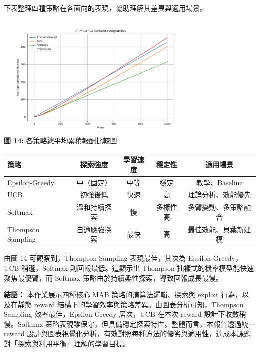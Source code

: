 \documentclass{article}
\begin{document}
下表整理四種策略在各面向的表現，協助理解其差異與適用場景。
\begin{center}
\includegraphics[width=0.75\textwidth]{./plots/mab_comparison.png} \\
\textbf{圖 14:} 各策略總平均累積報酬比較圖
\end{center}
\begin{center}
\begin{tabular}{|l|c|c|c|c|}
\hline
\textbf{策略} & \textbf{探索強度} & \textbf{學習速度} & \textbf{穩定性} & \textbf{適用場景} \\\hline
Epsilon-Greedy & 中（固定） & 中等 & 穩定 & 教學、Baseline \\\hline
UCB & 初強後低 & 快速 & 高 & 理論分析、效能優先 \\\hline
Softmax & 溫和持續探索 & 慢 & 多樣性高 & 多臂變動、多策略融合 \\\hline
Thompson Sampling & 自適應強探索 & 最快 & 高 & 最佳效能、貝葉斯建模 \\\hline
\end{tabular}
\end{center}

由圖 14 可觀察到，Thompson Sampling 表現最佳，其次為 Epsilon-Greedy，UCB 稍遜，Softmax 則回報最低。這顯示出 Thompson 抽樣式的機率模型能快速聚焦最優臂，而 Softmax 策略由於持續柔性探索，導致回報成長最慢。

\bigskip

\textbf{結語：} 本作業展示四種核心 MAB 策略的演算法邏輯、探索與 exploit 行為，以及在靜態 reward 結構下的學習效率與策略差異。由圖表分析可知，Thompson Sampling 效率最佳，Epsilon-Greedy 居次，UCB 在本次 reward 設計下收斂稍慢。Softmax 策略表現雖保守，但具備穩定探索特性。整體而言，本報告透過統一 reward 設計與圖表視覺化分析，有效對照每種方法的優劣與適用性，達成本課題對「探索與利用平衡」理解的學習目標。
\end{document}
